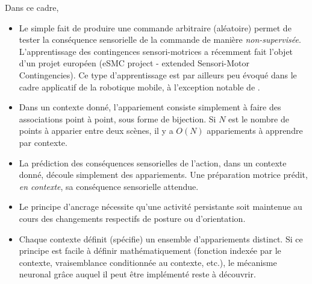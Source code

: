 \documentclass[11pt]{article}
\begin{document}
Dans ce cadre,
\begin{itemize}
	\item Le simple fait de produire une commande arbitraire
	(aléatoire) permet de tester la conséquence sensorielle de la commande de manière \textit{non-supervisée}.
	L'apprentissage des contingences sensori-motrices a récemment fait l'objet d'un projet européen (eSMC project \-- extended Sensori-Motor Contingencies). Ce type d'apprentissage est par ailleurs peu évoqué dans le cadre applicatif de la robotique mobile, à l'exception notable de .
	\item Dans un contexte donné, l'appariement consiste simplement à faire des associations point à point, sous forme de bijection. Si $N$ est le nombre de points à apparier entre deux scènes, il y a $O(N)$ appariements à apprendre par contexte. 
	\item La prédiction des conséquences sensorielles de l'action, dans un contexte donné, découle simplement des appariements. Une préparation motrice prédit, \textit{en contexte}, sa conséquence sensorielle attendue.
	\item Le principe d'ancrage nécessite qu'une activité persistante soit maintenue au cours des changements respectifs de posture ou d'orientation.
	\item Chaque contexte définit (spécifie) un ensemble d'appariements distinct. Si ce principe est facile à définir mathématiquement (fonction indexée par le contexte, vraisemblance conditionnée au contexte, etc.), le mécanisme neuronal grâce auquel il peut être implémenté reste à découvrir. 
\end{itemize}


 

 
%
%
\end{document}

